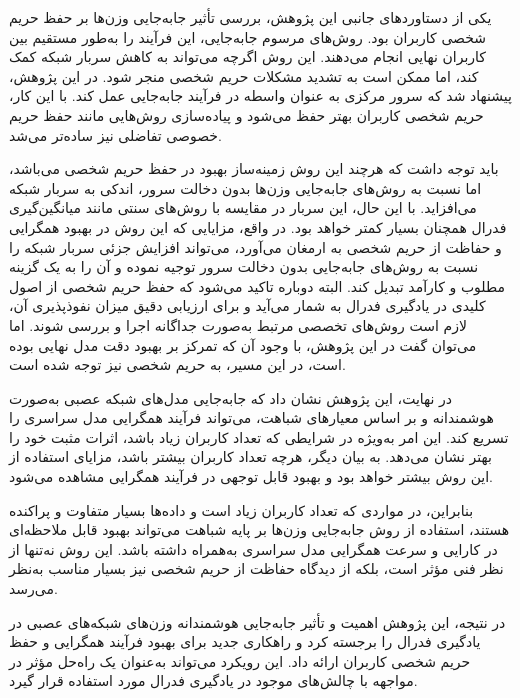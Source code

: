 یکی از دستاوردهای جانبی این پژوهش، بررسی تأثیر جابه‌جایی وزن‌ها بر حفظ حریم شخصی کاربران بود. روش‌های مرسوم جابه‌جایی، این فرآیند را به‌طور مستقیم بین کاربران نهایی انجام می‌دهند. این روش اگرچه می‌تواند به کاهش سربار شبکه کمک کند، اما ممکن است به تشدید مشکلات حریم شخصی منجر شود. در این پژوهش، پیشنهاد شد که سرور مرکزی به عنوان واسطه در فرآیند جابه‌جایی عمل کند. با این کار، حریم شخصی کاربران بهتر حفظ می‌شود و پیاده‌سازی روش‌هایی مانند حفظ حریم خصوصی تفاضلی نیز ساده‌تر می‌شد.


باید توجه داشت که هرچند این روش زمینه‌ساز بهبود در حفظ حریم شخصی می‌باشد، اما نسبت به روش‌های جابه‌جایی وزن‌ها بدون دخالت سرور، اندکی به سربار شبکه می‌افزاید. با این حال، این سربار در مقایسه با روش‌های سنتی مانند میانگین‌گیری فدرال همچنان بسیار کمتر خواهد بود. در واقع، مزایایی که این روش در بهبود همگرایی و حفاظت از حریم شخصی به ارمغان می‌آورد، می‌تواند افزایش جزئی سربار شبکه را نسبت به روش‌های جابه‌جایی بدون دخالت سرور توجیه نموده و آن را به یک گزینه مطلوب و کارآمد تبدیل کند.
البته دوباره تاکید می‌شود که حفظ حریم شخصی از اصول کلیدی در یادگیری فدرال به شمار می‌آید و برای ارزیابی دقیق میزان نفوذپذیری آن، لازم است روش‌های تخصصی مرتبط به‌صورت جداگانه اجرا و بررسی شوند. اما می‌توان گفت در این پژوهش، با وجود آن که تمرکز بر بهبود دقت مدل نهایی بوده است، در این مسیر، به حریم شخصی نیز توجه شده است.

در نهایت، این پژوهش نشان داد که جابه‌جایی مدل‌های شبکه عصبی به‌صورت هوشمندانه و بر اساس معیارهای شباهت، می‌تواند فرآیند همگرایی مدل سراسری را تسریع کند. این امر به‌ویژه در شرایطی که تعداد کاربران زیاد باشد، اثرات مثبت خود را بهتر نشان می‌دهد. به بیان دیگر، هرچه تعداد کاربران بیشتر باشد، مزایای استفاده از این روش بیشتر خواهد بود و بهبود قابل توجهی در فرآیند همگرایی مشاهده می‌شود.

بنابراین، در مواردی که تعداد کاربران زیاد است و داده‌ها بسیار متفاوت و پراکنده هستند، استفاده از روش‌ جابه‌جایی وزن‌ها بر پایه شباهت می‌تواند بهبود قابل ملاحظه‌ای در کارایی و سرعت همگرایی مدل سراسری به‌همراه داشته باشد. این روش نه‌تنها از نظر فنی مؤثر است، بلکه از دیدگاه حفاظت از حریم شخصی نیز بسیار مناسب به‌نظر می‌رسد.

در نتیجه، این پژوهش اهمیت و تأثیر جابه‌جایی هوشمندانه وزن‌های شبکه‌های عصبی در یادگیری فدرال را برجسته کرد و راهکاری جدید برای بهبود فرآیند همگرایی و حفظ حریم شخصی کاربران ارائه داد. این رویکرد می‌تواند به‌عنوان یک راه‌حل مؤثر در مواجهه با چالش‌های موجود در یادگیری فدرال مورد استفاده قرار گیرد.


